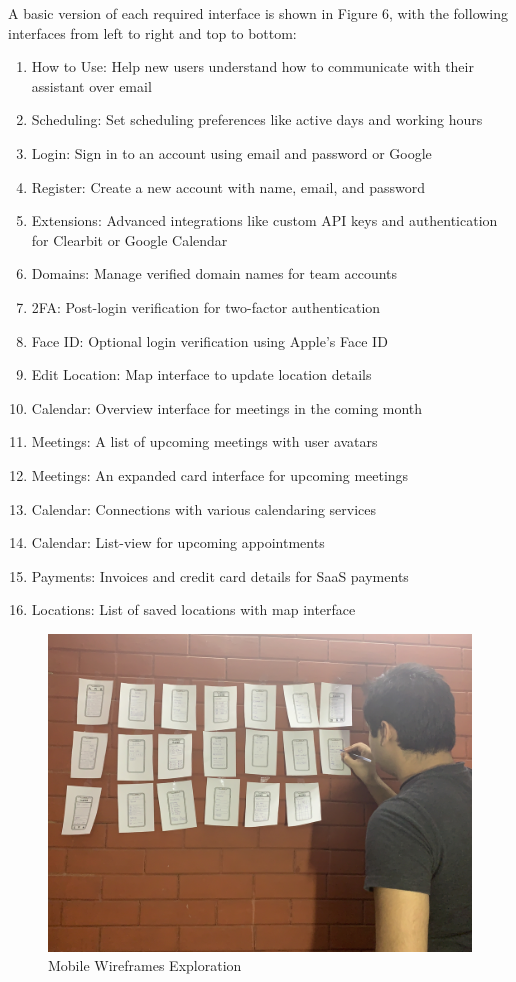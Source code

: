 \documentclass{article}
\begin{document}
 A basic version of each required interface is shown in Figure 6, with the following interfaces from left to right and top to bottom:
\begin{enumerate}
	\item How to Use: Help new users understand how to communicate with their assistant over email
	\item Scheduling: Set scheduling preferences like active days and working hours
	\item Login: Sign in to an account using email and password or Google
	\item Register: Create a new account with name, email, and password
	\item Extensions: Advanced integrations like custom API keys and authentication for Clearbit or Google Calendar
	\item Domains: Manage verified domain names for team accounts
	\item 2FA: Post-login verification for two-factor authentication
	\item Face ID: Optional login verification using Apple's Face ID
	\item Edit Location: Map interface to update location details
	\item Calendar: Overview interface for meetings in the coming month
	\item Meetings: A list of upcoming meetings with user avatars
	\item Meetings: An expanded card interface for upcoming meetings
	\item Calendar: Connections with various calendaring services
	\item Calendar: List-view for upcoming appointments
	\item Payments: Invoices and credit card details for SaaS payments
	\item Locations: List of saved locations with map interface
\end{enumerate}

\begin{figure}\centering
	\includegraphics[scale=0.035]{ideation-wall.jpg}
	\caption{Mobile Wireframes Exploration}
\end{figure}
\end{document}
